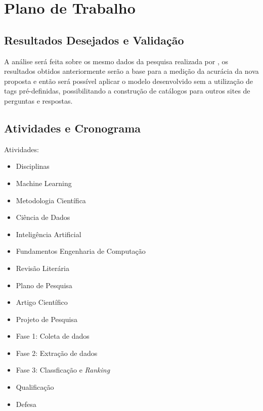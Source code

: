 \documentclass[10pt,a4paper,final]{article}
\begin{document}
  
    \section{Plano de Trabalho}

    \subsection{Resultados Desejados e Validação}
    
A análise será feita sobre os mesmo dados da pesquisa realizada por \cite{Arash2016}, os resultados obtidos anteriormente serão a base para a medição da acurácia da nova proposta e então será possível aplicar o modelo desenvolvido sem a utilização de tags pré-definidas, possibilitando a construção de catálogos para outros sites de perguntas e respostas.
 
    \subsection{Atividades e Cronograma}
    
Atividades:
    \begin{itemize}
    \item Disciplinas
	\item[] \quad Machine Learning
    \item[] \quad Metodologia Científica
    \item[] \quad Ciência de Dados
    \item[] \quad Inteligência Artificial
    \item[] \quad Fundamentos Engenharia de Computação
    \item Revisão Literária
    \item Plano de Pesquisa
    \item Artigo Científico
    \item Projeto de Pesquisa
    \item[] \quad Fase 1: Coleta de dados
    \item[] \quad Fase 2: Extração de dados
    \item[] \quad Fase 3: Classficação e \textit{Ranking}
    \item Qualificação
    \item Defesa
    \end{itemize}

\end{document}
